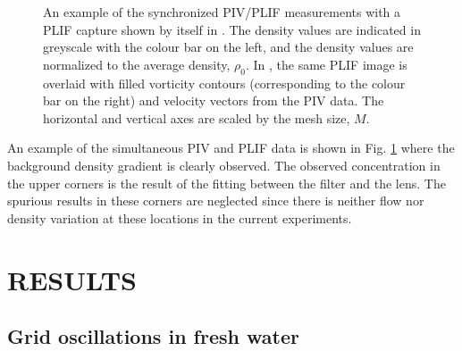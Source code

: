 \documentclass{piv13-abstract}
\newcommand{\figLabel}{Fig. }
\begin{document}
\begin{figure}[ht]
\centering
{}
\caption{An example of the synchronized PIV/PLIF measurements with a PLIF capture shown by itself in . The density values are indicated in greyscale with the colour bar on the left, and the density values are normalized to the average density, $\rho_0$. In , the same PLIF image is overlaid with filled vorticity contours (corresponding to the colour bar on the right) and velocity vectors from the PIV data. The horizontal and vertical axes are scaled by the mesh size, $M$. \label{fig:pivPlifDemo}}
\end{figure}

An example of the simultaneous PIV and PLIF data is shown in \figLabel\ref{fig:pivPlifDemo} where the background density gradient is clearly observed. The observed concentration in the upper corners is the result of the fitting between the filter and the lens. The spurious results in these corners are neglected since there is neither flow nor density variation at these locations in the current experiments.

\section{RESULTS}

\subsection{Grid oscillations in fresh water}
\label{sec:freshwater}
\end{document}
